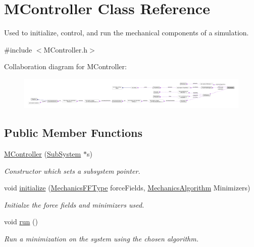 \hypertarget{classMController}{\section{M\+Controller Class Reference}
\label{classMController}
}


Used to initialize, control, and run the mechanical components of a simulation.  




{\ttfamily \#include $<$M\+Controller.\+h$>$}



Collaboration diagram for M\+Controller\+:
\nopagebreak
\begin{figure}[H]
\begin{center}
\leavevmode
\includegraphics[width=350pt]{classMController__coll__graph}
\end{center}
\end{figure}
\subsection*{Public Member Functions}
\begin{DoxyCompactItemize}
\item 
\hyperlink{classMController_a526f67950e7cdabe20330264b22721d7}{M\+Controller} (\hyperlink{classSubSystem}{Sub\+System} $\ast$s)
\begin{DoxyCompactList}\small\item\em Constructor which sets a subsystem pointer. \end{DoxyCompactList}\item 
void \hyperlink{classMController_a4187b5d2f2e2255af57c4525285058b0}{initialize} (\hyperlink{structMechanicsFFType}{Mechanics\+F\+F\+Type} force\+Fields, \hyperlink{structMechanicsAlgorithm}{Mechanics\+Algorithm} Minimizers)
\begin{DoxyCompactList}\small\item\em Initialze the force fields and minimizers used. \end{DoxyCompactList}\item 
void \hyperlink{classMController_ad120213292e23f5549d53fe2df3d2ffd}{run} ()
\begin{DoxyCompactList}\small\item\em Run a minimization on the system using the chosen algorithm. \end{DoxyCompactList}\end{DoxyCompactItemize}
